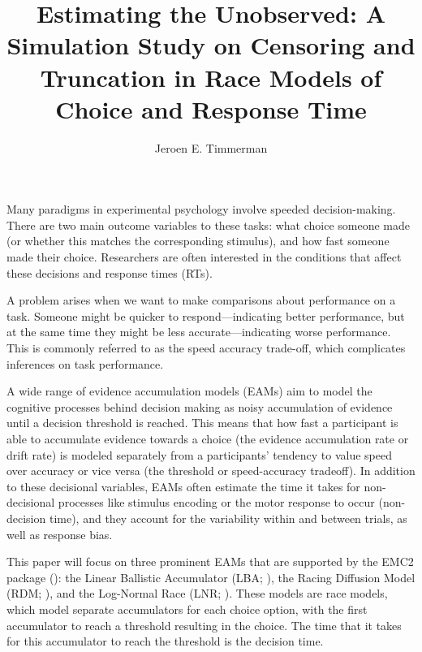 \documentclass[
  stu,
  floatsintext,
  longtable,
  nolmodern,
  notxfonts,
  notimes,
  draftfirst,
  colorlinks=true,linkcolor=blue,citecolor=blue,urlcolor=blue]{apa7}
\title{Estimating the Unobserved: A Simulation Study on Censoring and
Truncation in Race Models of Choice and Response Time}
\author{Jeroen E. Timmerman}
\affiliation{
{Department of Psychology, University of Amsterdam}}
\begin{document}
\maketitle


\setcounter{secnumdepth}{-\maxdimen} %

\setlength\LTleft{0pt}


Many paradigms in experimental psychology involve speeded
decision-making. There are two main outcome variables to these tasks:
what choice someone made (or whether this matches the corresponding
stimulus), and how fast someone made their choice. Researchers are often
interested in the conditions that affect these decisions and response
times (RTs).

A problem arises when we want to make comparisons about performance on a
task. Someone might be quicker to respond---indicating better
performance, but at the same time they might be less
accurate---indicating worse performance. This is commonly referred to as
the speed accuracy trade-off, which complicates inferences on task
performance.

A wide range of evidence accumulation models (EAMs) aim to model the
cognitive processes behind decision making as noisy accumulation of
evidence until a decision threshold is reached. This means that how fast
a participant is able to accumulate evidence towards a choice (the
evidence accumulation rate or drift rate) is modeled separately from a
participants' tendency to value speed over accuracy or vice versa (the
threshold or speed-accuracy tradeoff). In addition to these decisional
variables, EAMs often estimate the time it takes for non-decisional
processes like stimulus encoding or the motor response to occur
(non-decision time), and they account for the variability within and
between trials, as well as response bias.

This paper will focus on three prominent EAMs that are supported by the
EMC2 package (): the Linear
Ballistic Accumulator (LBA; ), the Racing Diffusion Model (RDM; ), and the Log-Normal Race (LNR; ). These models are race models, which model separate
accumulators for each choice option, with the first accumulator to reach
a threshold resulting in the choice. The time that it takes for this
accumulator to reach the threshold is the decision time.
\end{document}

